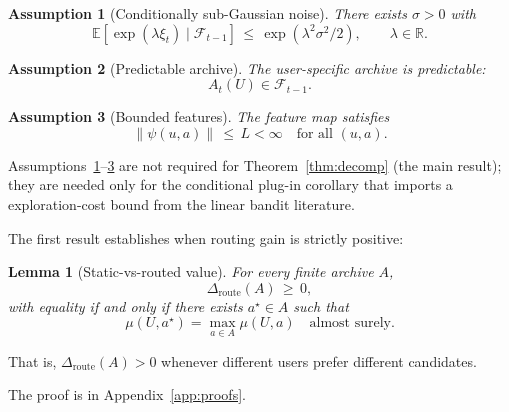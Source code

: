 \documentclass{article} %
\newtheorem{lemma}[theorem]{Lemma}
\newtheorem{assumption}{Assumption}
\providecommand{\E}{\mathbb{E}}
\begin{document}
\begin{assumption}[Conditionally sub-Gaussian noise]
\label{ass:subg}
There exists $\sigma > 0$ with
\begin{equation}
\label{eq:ass-subg}
\E\!\left[\exp(\lambda \xi_t) \mid \mathcal{F}_{t-1}\right] \,\le\, \exp(\lambda^2 \sigma^2 / 2), \qquad \lambda \in \mathbb{R}.
\end{equation}
\end{assumption}

\begin{assumption}[Predictable archive]
\label{ass:predictable}
The user-specific archive is predictable:
\begin{equation}
\label{eq:ass-pred}
A_t(U) \in \mathcal{F}_{t-1}.
\end{equation}
\end{assumption}

\begin{assumption}[Bounded features]
\label{ass:bounded-feat}
The feature map satisfies
\begin{equation}
\label{eq:ass-feat}
\|\psi(u,a)\| \,\le\, L < \infty \quad \text{for all } (u,a).
\end{equation}
\end{assumption}

Assumptions~\ref{ass:subg}--\ref{ass:bounded-feat} are not required for Theorem~\ref{thm:decomp} (the main result); they are needed only for the conditional plug-in corollary that imports a exploration-cost bound from the linear bandit literature.

\label{sec:method-lem-het}

The first result establishes when routing gain is strictly positive:

\begin{lemma}[Static-vs-routed value]
\label{lem:hetero}
For every finite archive $A$,
\begin{equation}
\label{eq:lem-hetero}
\Delta_{\mathrm{route}}(A) \,\ge\, 0,
\end{equation}
with equality if and only if there exists $a^\star \in A$ such that
\begin{equation}
\label{eq:lem-hetero-eq}
\mu(U, a^\star) = \max_{a \in A} \mu(U,a) \quad \text{almost surely.}
\end{equation}
\end{lemma}

That is, $\Delta_{\mathrm{route}}(A) > 0$ whenever different users prefer different candidates.

The proof is in Appendix~\ref{app:proofs}.
\end{document}
